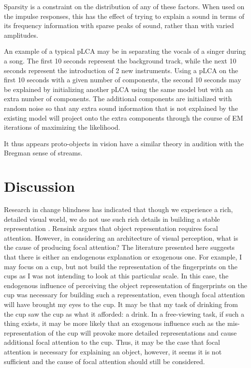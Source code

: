 Sparsity is a constraint on the distribution of any of these factors.  When used on the impulse responses, this has the effect of trying to explain a sound in terms of its frequency information with sparse peaks of sound, rather than with varied amplitudes.  

An example of a typical pLCA may be in separating the vocals of a singer during a song.  The first 10 seconds represent the background track, while the next 10 seconds represent the introduction of 2 new instruments.  Using a pLCA on the first 10 seconds with a given number of components, the second 10 seconds may be explained by initializing another pLCA using the same model but with an extra number of components.  The additional components are initialized with random noise so that any extra sound information that is not explained by the existing model will project onto the extra components through the course of EM iterations of maximizing the likelihood.	

It thus appears proto-objects in vision have a similar theory in audition with the Bregman sense of streams.  

\section{Discussion}

Research in change blindness has indicated that though we experience a rich, detailed visual world, we do not use such rich details in building a stable representation \cite{Simons1997}.  Rensink argues that object representation requires focal attention.  However, in considering an architecture of visual perception, what is the cause of producing focal attention?  The literature presented here suggests that there is either an endogenous explanation or exogenous one.  For example, I may focus on a cup, but not build the representation of the fingerprints on the cups as I was not intending to look at this particular scale.  In this case, the endogenous influence of perceiving the object representation of fingerprints on the cup was necessary for building such a representation, even though focal attention will have brought my eyes to the cup.  It may be that my task of drinking from the cup saw the cup as what it afforded: a drink.  In a free-viewing task, if such a thing exists, it may be more likely that an exogenous influence such as the mis-representation of the cup will provoke more detailed representations and cause additional focal attention to the cup.  Thus, it may be the case that focal attention is necessary for explaining an object, however, it seems it is not sufficient and the cause of focal attention should still be considered.  

